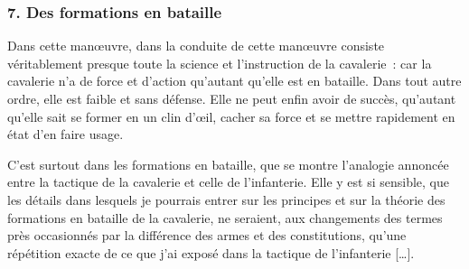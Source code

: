 \documentclass[french,twoside]{book} %
\begin{document}
\subsubsection[{7. Des formations en bataille}]{7. Des formations en bataille}
\noindent Dans cette manœuvre, dans la conduite de cette manœuvre consiste véritablement presque toute la science et l’instruction de la cavalerie : car la cavalerie n’a de force et d’action qu’autant qu’elle est en bataille. Dans tout autre ordre, elle est faible et sans défense. Elle ne peut enfin avoir de succès, qu’autant qu’elle sait se former en un clin d’œil, cacher sa force et se mettre rapidement en état d’en faire usage.\par
C’est surtout dans les formations en bataille, que se montre l’analogie annoncée entre la tactique de la cavalerie et celle de l’infanterie. Elle y est si sensible, que les détails dans lesquels je pourrais entrer sur les principes et sur la théorie des formations en bataille de la cavalerie, ne seraient, aux changements des termes près occasionnés par la différence des armes et des constitutions, qu’une répétition exacte de ce que j’ai exposé dans la tactique de l’infanterie […].
\end{document}
